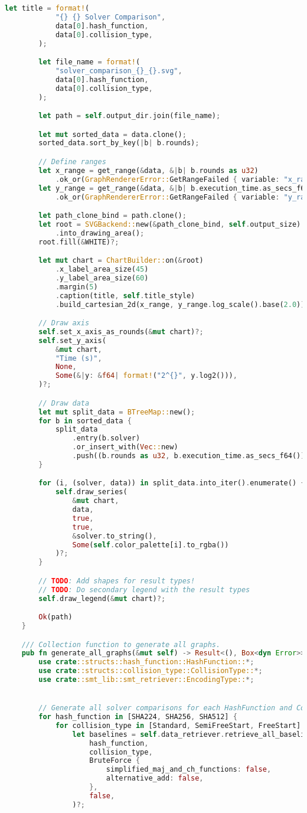 \begin{lstlisting}[language=rust, caption={graphing/graphs.rs}]
		let title = format!(
			"{} {} Solver Comparison",
			data[0].hash_function,
			data[0].collision_type,
		);

		let file_name = format!(
			"solver_comparison_{}_{}.svg",
			data[0].hash_function,
			data[0].collision_type,
		);

		let path = self.output_dir.join(file_name);

		let mut sorted_data = data.clone();
		sorted_data.sort_by_key(|b| b.rounds);

		// Define ranges
		let x_range = get_range(&data, &|b| b.rounds as u32)
			.ok_or(GraphRendererError::GetRangeFailed { variable: "x_range"})?;
		let y_range = get_range(&data, &|b| b.execution_time.as_secs_f64())
			.ok_or(GraphRendererError::GetRangeFailed { variable: "y_range"})?;

		let path_clone_bind = path.clone();
		let root = SVGBackend::new(&path_clone_bind, self.output_size)
			.into_drawing_area();
		root.fill(&WHITE)?;

		let mut chart = ChartBuilder::on(&root)
			.x_label_area_size(45)
			.y_label_area_size(60)
			.margin(5)
			.caption(title, self.title_style)
			.build_cartesian_2d(x_range, y_range.log_scale().base(2.0))?;

		// Draw axis
		self.set_x_axis_as_rounds(&mut chart)?;
		self.set_y_axis(
			&mut chart,
			"Time (s)",
			None,
			Some(&|y: &f64| format!("2^{}", y.log2())),
		)?;

		// Draw data
		let mut split_data = BTreeMap::new();
		for b in sorted_data {
			split_data
				.entry(b.solver)
				.or_insert_with(Vec::new)
				.push((b.rounds as u32, b.execution_time.as_secs_f64()));
		}

		for (i, (solver, data)) in split_data.into_iter().enumerate() {
			self.draw_series(
				&mut chart,
				data,
				true,
				true,
				&solver.to_string(),
				Some(self.color_palette[i].to_rgba())
			)?;
		}

		// TODO: Add shapes for result types!
		// TODO: Do secondary legend with the result types
		self.draw_legend(&mut chart)?;

		Ok(path)
	}

	/// Collection function to generate all graphs.
	pub fn generate_all_graphs(&mut self) -> Result<(), Box<dyn Error>> {
		use crate::structs::hash_function::HashFunction::*;
		use crate::structs::collision_type::CollisionType::*;
		use crate::smt_lib::smt_retriever::EncodingType::*;


		// Generate all solver comparisons for each HashFunction and CollisionType
		for hash_function in [SHA224, SHA256, SHA512] {
			for collision_type in [Standard, SemiFreeStart, FreeStart] {
				let baselines = self.data_retriever.retrieve_all_baselines_with_encoding(
					hash_function,
					collision_type,
					BruteForce {
						simplified_maj_and_ch_functions: false,
						alternative_add: false,
					},
					false,
				)?;


\end{lstlisting}
